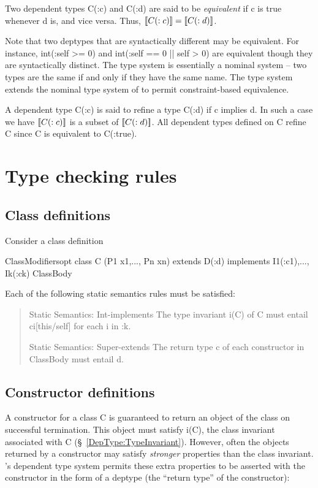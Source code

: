 Two dependent types {\cf C(:c)} and {\cf C(:d)} are said to be {\em equivalent} if 
{\cf c} is true whenever {\cf d} is, and vice versa. Thus, 
$\LL{C(:c)} = \LL{C(:d)}$.

Note that two deptypes that are syntactically different may be
equivalent. For instance, {\cf int(:self >= 0)} and {\cf int(:self ==
0 || self > 0)} are equivalent though they are syntactically
distinct. The \Java{} type system is essentially a nominal system -- two
types are the same if and only if they have the same name. The \Xten{}
type system extends the nominal type system of \Java{} to permit
constraint-based equivalence.

A dependent type {\cf C(:c)} is said to refine a type {\cf C(:d)} if
{\cf c} implies {\cf d}.  In such a case we have $\LL{C(:c)}$ is a
subset of $\LL{C(:d)}$. All dependent types defined on {\cf C} refine
{\cf C} since {\cf C} is equivalent to {\cf C(:true)}.

\section{Type checking rules}
\subsection{Class definitions}

Consider a class definition
\begin{x10}
ClassModifiersopt 
 class C (P1 x1,..., Pn xn)  extends D(:d) 
   implements I1(:c1),..., Ik(:ck)
 ClassBody  
\end{x10}

Each of the following static semantics rules must be satisfied:

\begin{quotation}
{\sc Static Semantics: Int-implements}
    The type invariant {\cf i(C)} of {\cf C} must entail {\cf ci[this/self]} for each 
  {\cf i} in {:k}.  

{\sc Static Semantics: Super-extends}
    The return type {\cf c} of each constructor in {\cf ClassBody} must entail {\cf d}.
\end{quotation}

\subsection{Constructor definitions}

A constructor for a class {\cf C} is guaranteed to return an object of the
class on successful termination. This object must satisfy i(C), the
class invariant associated with {\cf C} (\S~\ref{DepType:TypeInvariant}). However,
often the objects returned by a constructor may satisfy {\em stronger}
properties than the class invariant. \Xten{}'s dependent type system
permits these extra properties to be asserted with the constructor in
the form of a deptype (the ``return type'' of the constructor):

